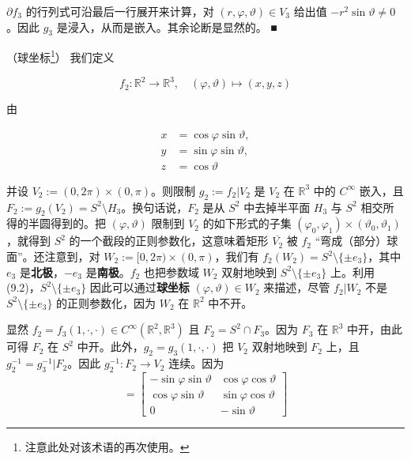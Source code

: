 \begin{example}
$ \partial f_{3} $ 的行列式可沿最后一行展开来计算，对 $ (r, \varphi, \vartheta) \in V_{3} $ 给出值 $ -r^{2}\sin\vartheta \ne 0 $。因此 $ g_{3} $ 是浸入，从而是嵌入。其余论断是显然的。 \nobreak\hspace{0.35em}■

\begin{items}
\item[（b）]

（球坐标\footnote{注意此处对该术语的再次使用。}）
我们定义

\[
f_{2} : \mathbb{R}^{2} \to \mathbb{R}^{3} , \quad (\varphi, \vartheta) \mapsto (x, y, z)
\]

由

\begin{equation}
\begin{aligned}
x &= \cos\varphi\sin\vartheta , \\ y &= \sin\varphi\sin\vartheta , \\ z &= \cos\vartheta
\end{aligned}\tag{9.2}
\end{equation}

并设 $ V_{2} := (0, 2\pi) \times (0, \pi) $。则限制 $ g_{2} := f_{2}|V_{2} $ 是 $ V_{2} $ 在 $ \mathbb{R}^{3} $ 中的 $ C^{\infty} $ 嵌入，且 $ F_{2} := g_{2}(V_{2}) = S^{2} \setminus H_{3} $。换句话说，$ F_{2} $ 是从 $ S^{2} $ 中去掉半平面 $ H_{3} $ 与 $ S^{2} $ 相交所得的半圆得到的。把 $ (\varphi, \vartheta) $ 限制到 $ V_{2} $ 的如下形式的子集 $ (\varphi_{0}, \varphi_{1}) \times (\vartheta_{0}, \vartheta_{1}) $，就得到 $ S^{2} $ 的一个截段的正则参数化，这意味着矩形 $ \overline{V_{2}} $ 被 $ f_{2} $ “弯成（部分）球面”。还注意到，对 $ W_{2} := [0, 2\pi) \times (0, \pi) $，我们有 $ f_{2}(W_{2}) = S^{2}\setminus\{\pm e_{3}\} $，其中 $ e_{3} $ 是\textbf{北极}，$ -e_{3} $ 是\textbf{南极}。$ f_{2} $ 也把参数域 $ W_{2} $ 双射地映到 $ S^{2}\setminus\{\pm e_{3}\} $ 上。利用 (9.2)，$ S^{2}\setminus\{\pm e_{3}\} $ 因此可以通过\textbf{球坐标} $ (\varphi, \vartheta) \in W_{2} $ 来描述，尽管 $ f_{2}|W_{2} $ 不是 $ S^{2} \setminus \{\pm e_{3}\} $ 的正则参数化，因为 $ W_{2} $ 在 $ \mathbb{R}^{2} $ 中不开。

\end{items}


\proofhead
显然 $ f_{2} = f_{3}(1, \cdot, \cdot) \in C^{\infty}(\mathbb{R}^{2}, \mathbb{R}^{3}) $ 且 $ F_{2} = S^{2} \cap F_{3} $。因为 $ F_{3} $ 在 $ \mathbb{R}^{3} $ 中开，由此可得 $ F_{2} $ 在 $ S^{2} $ 中开。此外，$ g_{2} = g_{3}(1, \cdot, \cdot) $ 把 $ V_{2} $ 双射地映到 $ F_{2} $ 上，且 $ g_{2}^{-1} = g_{3}^{-1}|F_{2} $。因此 $ g_{2}^{-1} : F_{2} \to V_{2} $ 连续。因为
\begin{equation}
[\partial f_{2}(\varphi, \vartheta)] = \begin{bmatrix} -\sin\varphi\sin\vartheta & \cos\varphi\cos\vartheta \\ \cos\varphi\sin\vartheta & \sin\varphi\cos\vartheta \\ 0 & -\sin\vartheta \end{bmatrix}\tag{9.3}
\end{equation}


\end{example}
